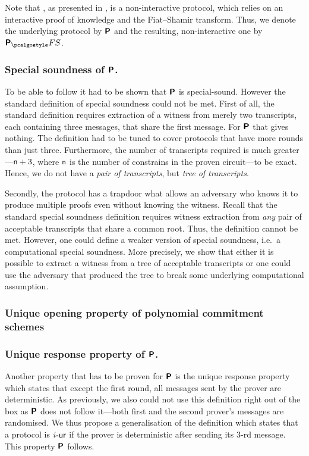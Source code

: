 \let\accentvec\vec \documentclass[runningheads,10pt]{llncs}
\begin{document}
Note that \plonk{}, as presented in \cite{EPRINT:GabWilCio19}, is a
non-interactive protocol, which relies on an interactive proof of knowledge and
the Fiat--Shamir transform. Thus, we denote the underlying protocol by
$\bm{\mathsf{P}}$ and the resulting, non-interactive one by $\plonkprot_\fs$. 

\subsubsection{Special soundness of $\bm{\mathsf{P}}$.} To be able to follow
\cite{INDOCRYPT:FKMV12} it had to be shown that $\bm{\mathsf{P}}$ is special-sound.
However the standard definition of special soundness could not be met.  First of
all, the standard definition requires extraction of a witness from merely two
transcripts, each containing three messages, that share the first message. For
$\bm{\mathsf{P}}$ that gives nothing. The definition had to be tuned to cover
protocols that have more rounds than just three.  Furthermore, the number of
transcripts required is much greater---$\mathsf{n} + 3$, where
$\mathsf{n}$ is the number of constrains in the proven circuit---to be
exact. Hence, we do not have a \emph{pair of transcripts}, but \emph{tree of
transcripts}.

Secondly, the protocol has a trapdoor what allows an adversary who knows it to
produce multiple proofs even without knowing the witness. Recall that the
standard special soundness definition requires witness extraction from
\emph{any} pair of acceptable transcripts that share a common root. Thus, the
definition cannot be met. However, one could define a weaker version of special
soundness, i.e.~a computational special soundness. More precisely, we show that
either it is possible to extract a witness from a tree of acceptable transcripts
or one could use the adversary that produced the tree to break some underlying
computational assumption.

\subsubsection{Unique opening property of polynomial commitment schemes}%
\label{ssub:unique_opening_property_of_pcom}



\subsubsection{Unique response property of $\bm{\mathsf{P}}$.} Another property that
has to be proven for $\bm{\mathsf{P}}$ is the unique response property
\cite{C:Fischlin05} which states that except the first round, all messages sent
by the prover are deterministic. As previously, we also could not use this
definition right out of the box as $\bm{\mathsf{P}}$ does not follow it---both first
and the second prover's messages are randomised. We thus propose a
generalisation of the definition which states that a protocol is ${i\text{-}\mathsf{ur}}$ if the
prover is deterministic after sending its $3$-rd message. This property
$\bm{\mathsf{P}}$ follows.
\end{document}
